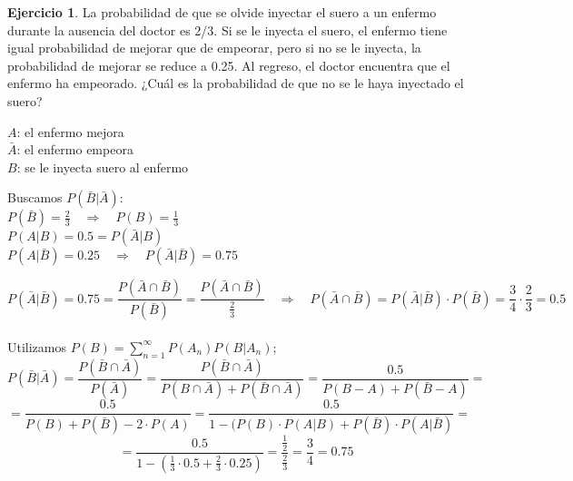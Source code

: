 \documentclass[a4paper, 12pt]{article}
\theoremstyle{definition}
\newtheorem{ej}{Ejercicio}
\begin{document}
\begin{ej}
La probabilidad de que se olvide inyectar el suero a un enfermo durante la ausencia del doctor es
2/3. Si se le inyecta el suero, el enfermo tiene igual probabilidad de mejorar que de empeorar, pero
si no se le inyecta, la probabilidad de mejorar se reduce a 0.25. Al regreso, el doctor encuentra
que el enfermo ha empeorado. ¿Cuál es la probabilidad de que no se le haya inyectado el suero?

\medskip

$A$: el enfermo mejora \\ $\bar{A}$: el enfermo empeora\\
$B$: se le inyecta suero al enfermo

\medskip

Buscamos $P(\bar{B}|\bar{A})$: \\
$P(\bar{B}) = \frac{2}{3} \quad\Longrightarrow\quad P(B)=\frac{1}{3}$ \\
$P(A|B) = 0.5= P(\bar{A}|B)$ \\
$P(A|\bar{B}) = 0.25 \quad\Longrightarrow\quad P(\bar{A}|\bar{B}) = 0.75$

\[P(\bar{A}|\bar{B}) = 0.75 = \frac{P(\bar{A}\cap\bar{B})}{P(\bar{B})} = \frac{P(\bar{A}\cap\bar{B})}{\frac{2}{3}}\quad\Longrightarrow\quad P(\bar{A}\cap\bar{B}) = P(\bar{A}|\bar{B})\cdot P(\bar{B}) = \frac{3}{4}\cdot\frac{2}{3} = 0.5 \] \\
Utilizamos $P(B) = \sum_{n=1}^\infty P(A_n) P(B|A_n)$;
\[P(\bar{B}|\bar{A}) = \frac{P(\bar{B}\cap\bar{A})}{P(\bar{A})} = \frac{P(\bar{B}\cap\bar{A})}{P(B\cap\bar{A})+P(\bar{B}\cap\bar{A})} = \frac{0.5}{P(B-A) + P(\bar{B}-A)} =\]
\[= \frac{0.5}{P(B)+P(\bar{B})-2\cdot P(A)} = \frac{0.5}{1-(P(B)\cdot P(A|B) + P(\bar{B})\cdot P(A|\bar{B})} = \]
\[ = \frac{0.5}{1-(\frac{1}{3} \cdot 0.5 + \frac{2}{3}\cdot 0.25)} = \frac{\frac{1}{2}}{\frac{2}{3}} = \frac{3}{4} = 0.75\]

\end{ej}

\medskip
\end{document}
